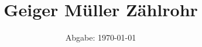 

\subject{Versuchsnummer: 703}
\title{Geiger Müller Zählrohr}
\date{
  Abgabe: \today
}



\maketitle
\thispagestyle{empty}
\tableofcontents
\newpage




\newpage
\nocite{*}
\printbibliography
\newpage



